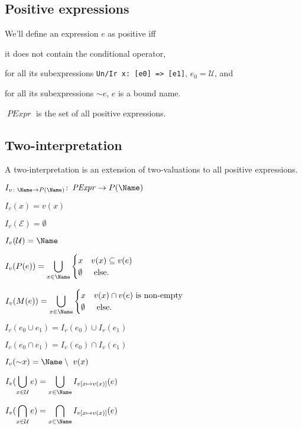 \documentclass[oneside,12pt]{book}
\theoremstyle{definition}
\theoremstyle{remark}
\newcommand{\ct}{{\sim}} %
\newcommand\var[1]{\mathop{\mathit{#1}}\nolimits}
\newcommand{\pSet}{P}
\newcommand{\mSet}{M}
\newcommand{\Empty}{\mathcal{E}}
\newcommand{\Universal}{\mathcal{U}}
\newcommand{\PExpr}{\var{PExpr}}
\begin{document}
\subsection{Positive expressions}

\begin{defBox}
  We'll define an expression $e$ as positive iff
  \begin{compactenum}
    \item it does not contain the conditional operator,
    \item for all its subexpressions \texttt{Un/Ir x: [e0] => [e1]},
      $e_0 = \Universal$, and
    \item for all its subexpressions $\ct e$, $e$ is a bound name.
  \end{compactenum}
  
  \medskip \noindent $\PExpr$ is the set of all positive expressions.
\end{defBox}

\subsection{Two-interpretation}
A two-interpretation is an extension of two-valuations to all positive expressions.

\begin{defBox}
  $I_{v\colon \Name \to P(\Name)}\colon \PExpr \to P(\Name)$
  
  \medskip \noindent $I_v(x) = v(x)$
  
  \medskip \noindent $I_v(\Empty) = \emptyset$
  
  \noindent $I_v(\Universal) = \Name$
  
  \noindent $I_v(\pSet(e)) = \displaystyle\bigcup_{x \in \Name}\begin{cases}
    x & v(x) \subseteq v(e) \\
    \emptyset & \text{ else.}
  \end{cases}$
  
  \medskip \noindent $I_v(\mSet(e)) = \displaystyle\bigcup_{x \in \Name}\begin{cases}
    x & v(x) \cap v(e) \text{ is non-empty} \\
    \emptyset & \text{ else.}
  \end{cases}$
  
  \medskip \noindent $I_v(e_0 \cup e_1) = I_v(e_0) \cup I_v(e_1)$
  
  \noindent $I_v(e_0 \cap e_1) = I_v(e_0) \cap I_v(e_1)$
  
  \noindent $I_v(\ct x) = \Name \setminus~v(x)$
  
  \medskip \noindent $\displaystyle I_v(\bigcup_{x \in \Universal}e) =
    \bigcup_{x \in \Name}I_{v[x \mapsto v(x)]}(e)$
  
  \medskip \noindent $\displaystyle I_v(\bigcap_{x \in \Universal}e) =
    \bigcap_{x \in \Name}I_{v[x \mapsto v(x)]}(e)$
  
\end{defBox}
\end{document}
